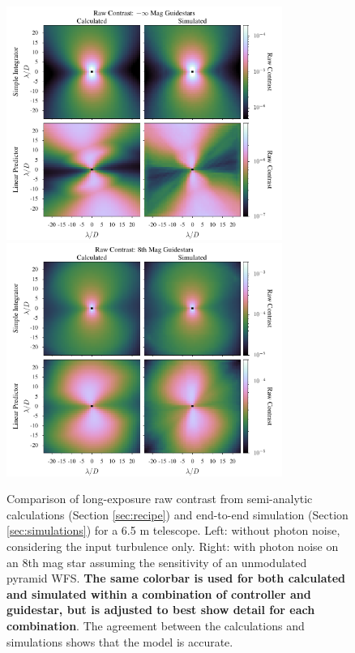 \documentclass[10pt,preprint]{aastex631}
\begin{document}
\begin{figure}
\hspace{-0.3in}
\includegraphics[width=3.54in]{contrast0mag.pdf}
\includegraphics[width=3.54in]{contrast8mag.pdf}
\caption{Comparison of long-exposure raw contrast from semi-analytic calculations (Section \ref{sec:recipe}) and end-to-end simulation (Section \ref{sec:simulations}) for a 6.5 m telescope. Left: without photon noise, considering the input turbulence only.  Right: with photon noise on an 8th mag star assuming the sensitivity of an unmodulated pyramid WFS. \textbf{The same colorbar is used for both calculated and simulated within a combination of controller and guidestar, but is adjusted to best show detail for each combination}.  The agreement between the calculations and simulations shows that the model is accurate.\label{fig:contrast_2Dcomp}}
\end{figure}
\end{document}
